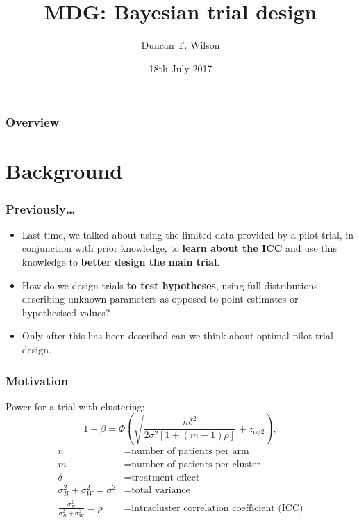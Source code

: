 \documentclass{beamer}
\title{MDG: Bayesian trial design}
\author{Duncan T. Wilson}
\institute[LICTR] %
{
\texttt{[image: U:/Misc/Logos/LICTR\_logo]}\\
Clinical Trials Research Unit \\ %
Leeds Institute of Clinical Trials Research \\
University of Leeds \\
\medskip
\textit{d.t.wilson@leeds.ac.uk} %
}
\date{18th July 2017}
\begin{document}
\begin{frame}
\titlepage %
\end{frame}

\begin{frame}
\frametitle{Overview}
\tableofcontents 
\end{frame}


\section{Background}

\begin{frame}
\frametitle{Previously\ldots}
\begin{itemize}
\item Last time, we talked about using the limited data provided by a pilot trial, in conjunction with prior knowledge, to \textbf{learn about the ICC} and use this knowledge to \textbf{better design the main trial}.
\item How do we design trials \textbf{to test hypotheses}, using full distributions describing unknown parameters as opposed to point estimates or hypothesised values?
\item Only after this has been described can we think about optimal pilot trial design.
\end{itemize}
\end{frame}

\begin{frame}
\frametitle{Motivation}
Power for a trial with clustering:
\begin{equation*}
1-\beta = \Phi\left( \sqrt{ \frac{n\delta^{2}}{2\sigma^{2}[1+(m-1)\rho]} } + z_{\alpha/2} \right),
\end{equation*}
\begin{align*}
n &= \text{number of patients per arm} \\
m &= \text{number of patients per cluster} \\
\delta &= \text{treatment effect} \\
\sigma_{B}^{2} + \sigma_{W}^{2} = \sigma^{2} &= \text{total variance} \\
\frac{\sigma_{B}^{2}}{\sigma_{B}^{2} + \sigma_{W}^{2}} = \rho &= \text{intracluster correlation coefficient (ICC)}
\end{align*}
\end{frame}
\end{document}
